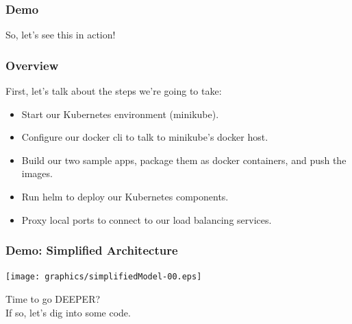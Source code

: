 \documentclass{beamer}
\begin{document}
\begin{frame}
    \frametitle{Demo}
    \begin{center}
        \Huge So, let's see this in action!
    \end{center}
\end{frame}

\begin{frame}
    \frametitle{Overview}
    First, let's talk about the steps we're going to take:
    \begin{itemize}
        \item Start our Kubernetes environment (minikube).
        \item Configure our docker cli to talk to minikube's docker host.
        \item Build our two sample apps, package them as docker containers, and push the images.
        \item Run helm to deploy our Kubernetes components.
        \item Proxy local ports to connect to our load balancing services.
    \end{itemize}
\end{frame}

\begin{frame}
    \frametitle{Demo: Simplified Architecture}
    \texttt{[image: graphics/simplifiedModel-00.eps]}
\end{frame}

\begin{frame}
    \begin{center}
        \Huge Time to go DEEPER?\\
        If so, let's dig into some code.
    \end{center}
\end{frame}
\end{document}
